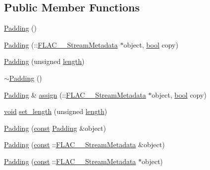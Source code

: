 \subsection*{Public Member Functions}
\begin{DoxyCompactItemize}
\item 
\hyperlink{class_f_l_a_c_1_1_metadata_1_1_padding_a96ae2879a65b3e67e9a4be8bde005f54}{Padding} ()
\item 
\hyperlink{class_f_l_a_c_1_1_metadata_1_1_padding_a358085e3cec897ed0b0c88c8ac04618d}{Padding} (\+::\hyperlink{struct_f_l_a_c_____stream_metadata}{F\+L\+A\+C\+\_\+\+\_\+\+Stream\+Metadata} $\ast$object, \hyperlink{mac_2config_2i386_2lib-src_2libsoxr_2soxr-config_8h_abb452686968e48b67397da5f97445f5b}{bool} copy)
\item 
\hyperlink{class_f_l_a_c_1_1_metadata_1_1_padding_abd84a1378c3fb563fe25576f81316a48}{Padding} (unsigned \hyperlink{test__lib_f_l_a_c_2format_8c_ac94dc16b22556ba5fa815655f27442da}{length})
\item 
\hyperlink{class_f_l_a_c_1_1_metadata_1_1_padding_aa2aa27f13cb93c5c7163cdfa45d61798}{$\sim$\+Padding} ()
\item 
\hyperlink{class_f_l_a_c_1_1_metadata_1_1_padding}{Padding} \& \hyperlink{class_f_l_a_c_1_1_metadata_1_1_padding_a3b7508e56df71854ff1f5ad9570b5684}{assign} (\+::\hyperlink{struct_f_l_a_c_____stream_metadata}{F\+L\+A\+C\+\_\+\+\_\+\+Stream\+Metadata} $\ast$object, \hyperlink{mac_2config_2i386_2lib-src_2libsoxr_2soxr-config_8h_abb452686968e48b67397da5f97445f5b}{bool} copy)
\item 
\hyperlink{sound_8c_ae35f5844602719cf66324f4de2a658b3}{void} \hyperlink{class_f_l_a_c_1_1_metadata_1_1_padding_addd51552e05e0c569dc3859431bb2840}{set\+\_\+length} (unsigned \hyperlink{test__lib_f_l_a_c_2format_8c_ac94dc16b22556ba5fa815655f27442da}{length})
\end{DoxyCompactItemize}
{\bf }\par
\begin{DoxyCompactItemize}
\item 
\hyperlink{class_f_l_a_c_1_1_metadata_1_1_padding_a3a5665a824530dec2906d76e665573ee}{Padding} (\hyperlink{getopt1_8c_a2c212835823e3c54a8ab6d95c652660e}{const} \hyperlink{class_f_l_a_c_1_1_metadata_1_1_padding}{Padding} \&object)
\item 
\hyperlink{class_f_l_a_c_1_1_metadata_1_1_padding_a8cfa2104a846a25154ca6b431683c563}{Padding} (\hyperlink{getopt1_8c_a2c212835823e3c54a8ab6d95c652660e}{const} \+::\hyperlink{struct_f_l_a_c_____stream_metadata}{F\+L\+A\+C\+\_\+\+\_\+\+Stream\+Metadata} \&object)
\item 
\hyperlink{class_f_l_a_c_1_1_metadata_1_1_padding_a9ffc1c44b0d114998b72e2a9a4be7c0a}{Padding} (\hyperlink{getopt1_8c_a2c212835823e3c54a8ab6d95c652660e}{const} \+::\hyperlink{struct_f_l_a_c_____stream_metadata}{F\+L\+A\+C\+\_\+\+\_\+\+Stream\+Metadata} $\ast$object)
\end{DoxyCompactItemize}

